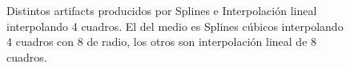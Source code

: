 \begin{figure}[H]
\centering
\begin{minipage}{0.31\textwidth}   

\end{minipage}
\hfill
\begin{minipage}{0.31\textwidth}   
\end{minipage}
\hfill
\begin{minipage}{0.31\textwidth}   
\end{minipage}
\caption{\footnotesize Distintos artifacts producidos por Splines e Interpolación lineal interpolando 4 cuadros. El del medio es Splines cúbicos interpolando 4 cuadros con 8 de radio, los otros son interpolación lineal de 8 cuadros.}

\label{fig:ff6}

\end{figure}

